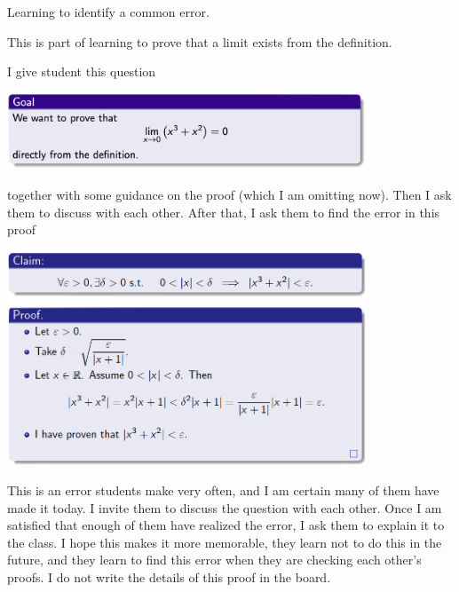 \documentclass[11pt]{article}
\begin{document}
	\begin{example}
		Learning to identify a common error.
		\begin{background}
			This is part of learning to prove that a limit exists from the definition.
		\end{background}
		\begin{question}
			I give student this question
			\begin{center}
				\includegraphics[width=0.8\textwidth]{EX10a}
			\end{center}
			together with some guidance on the proof (which I am omitting now). Then I
			ask them to discuss with each other. After that, I ask them to find the
			error in this proof
			\begin{center}
				\includegraphics[width=0.8\textwidth]{EX10b}
			\end{center}
		\end{question}
		\begin{comments}
			This is an error students make very often, and I am certain many of them
			have made it today. I invite them to discuss the question with each other.
			Once I am satisfied that enough of them have realized the error, I ask them
			to explain it to the class. I hope this makes it more memorable, they learn
			not to do this in the future, and they learn to find this error when they
			are checking each other's proofs. I do not write the details of this proof
			in the board.
		\end{comments}
	\end{example}

\end{document}
